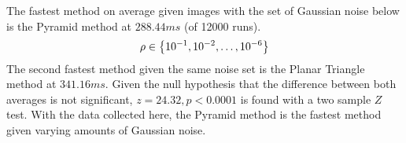 %
%
%
%
The fastest method on average given images with the set of Gaussian noise below is the Pyramid method at
$288.44\si{ms}$ (of 12000 runs).
\begin{equation}\label{eq:sigmasTested}
    \rho \in \set{10^{-1}, 10^{-2}, \ldots, 10^{-6}}
\end{equation}
The second fastest method given the same noise set is the Planar Triangle method at $341.16\si{ms}$.
Given the null hypothesis that the difference between both averages is not significant, $z = 24.32, p < 0.0001$ is
found with a two sample $Z$ test.
With the data collected here, the Pyramid method is the fastest method given varying amounts of Gaussian noise.

\begin{figure*} %
\end{figure*}

